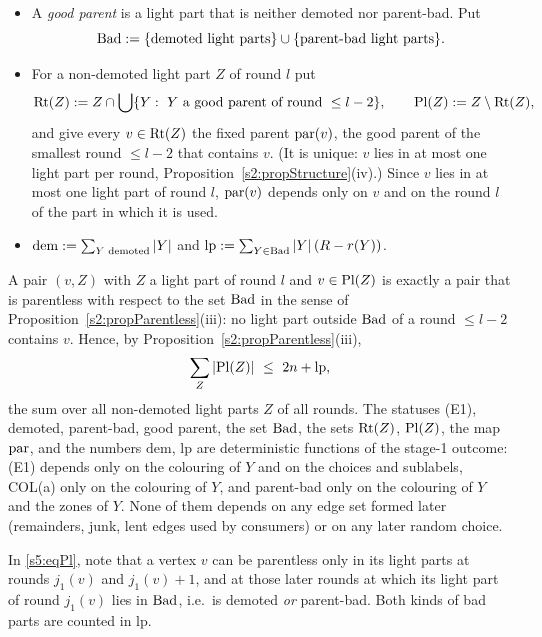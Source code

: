 \begin{definition}
\begin{itemize}
\item A \emph{good parent} is a light part that is neither demoted nor parent-bad. Put
\[
\mathrm{Bad}\mathrel{:=}\{\text{demoted light parts}\}\cup\{\text{parent-bad light parts}\}.
\]
\item For a non-demoted light part $Z$ of round $l$ put
\[
\mathrm{Rt}(Z)\mathrel{:=} Z\cap\bigcup\{Y:\ Y\text{ a good parent of round }\le l-2\},\qquad \mathrm{Pl}(Z)\mathrel{:=} Z\setminus\mathrm{Rt}(Z),
\]
and give every $v\in\mathrm{Rt}(Z)$ the fixed parent $\mathrm{par}(v)$, the good parent of the smallest round $\le l-2$ that contains $v$. (It is unique: $v$ lies in at most one light part per round, Proposition~\ref{s2:propStructure}(iv).) Since $v$ lies in at most one light part of round $l$, $\mathrm{par}(v)$ depends only on $v$ and on the round $l$ of the part in which it is used.
\item $\mathrm{dem}\mathrel{:=}\sum_{Y\text{ demoted}}|Y|$ and $\mathrm{lp}\mathrel{:=}\sum_{Y\in\mathrm{Bad}}|Y|\,(R-r(Y))$.
\end{itemize}
A pair $(v,Z)$ with $Z$ a light part of round $l$ and $v\in\mathrm{Pl}(Z)$ is exactly a pair that is parentless with respect to the set $\mathrm{Bad}$ in the sense of Proposition~\ref{s2:propParentless}(iii): no light part outside $\mathrm{Bad}$ of a round $\le l-2$ contains $v$. Hence, by Proposition~\ref{s2:propParentless}(iii),
\begin{equation}\label{s5:eqPl}
\sum_{Z}|\mathrm{Pl}(Z)|\ \le\ 2n+\mathrm{lp},
\end{equation}
the sum over all non-demoted light parts $Z$ of all rounds. The statuses (E1), demoted, parent-bad, good parent, the set $\mathrm{Bad}$, the sets $\mathrm{Rt}(Z)$, $\mathrm{Pl}(Z)$, the map $\mathrm{par}$, and the numbers $\mathrm{dem}$, $\mathrm{lp}$ are deterministic functions of the stage-1 outcome: (E1) depends only on the colouring of $Y$ and on the choices and sublabels, COL(a) only on the colouring of $Y$, and parent-bad only on the colouring of $Y$ and the zones of $Y$. None of them depends on any edge set formed later (remainders, junk, lent edges used by consumers) or on any later random choice.
\deps{\ref{s5:defZones}, \ref{s3:defCOL}, \ref{s3:lemHB}, \ref{s2:propParentless}, \ref{s2:defAncestors}, \ref{s2:propStructure}, \ref{s2:lemTower}, \ref{s1:citDef7}}
\end{definition}

In \eqref{s5:eqPl}, note that a vertex $v$ can be parentless only in its light parts at rounds $j_1(v)$ and $j_1(v)+1$, and at those later rounds at which its light part of round $j_1(v)$ lies in $\mathrm{Bad}$, i.e.\ is demoted \emph{or} parent-bad. Both kinds of bad parts are counted in $\mathrm{lp}$.


